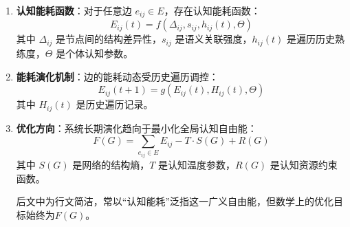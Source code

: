 \documentclass[12pt,a4paper]{article}
\begin{document}
\begin{enumerate}
\item \textbf{认知能耗函数}：对于任意边 $e_{ij} \in E$，存在认知能耗函数：
\begin{equation}
E_{ij}(t) = f(\Delta_{ij}, s_{ij}, h_{ij}(t), \Theta)
\end{equation}
其中 $\Delta_{ij}$ 是节点间的结构差异性，$s_{ij}$ 是语义关联强度，$h_{ij}(t)$ 是遍历历史熟练度，$\Theta$ 是个体认知参数。

\item \textbf{能耗演化机制}：边的能耗动态受历史遍历调控：
\begin{equation}
E_{ij}(t+1) = g(E_{ij}(t), H_{ij}(t), \Theta)
\end{equation}
其中 $H_{ij}(t)$ 是历史遍历记录。

\item \textbf{优化方向}：系统长期演化趋向于最小化全局认知自由能：
\begin{equation}
F(G) = \sum_{e_{ij} \in E} E_{ij} - T \cdot S(G) + R(G)
\end{equation}
其中 $S(G)$ 是网络的结构熵，$T$ 是认知温度参数，$R(G)$ 是认知资源约束函数。
\begin{small}
    后文中为行文简洁，常以“认知能耗”泛指这一广义自由能，但数学上的优化目标始终为$F(G)$。
\end{small}


\end{enumerate}
\end{document}

